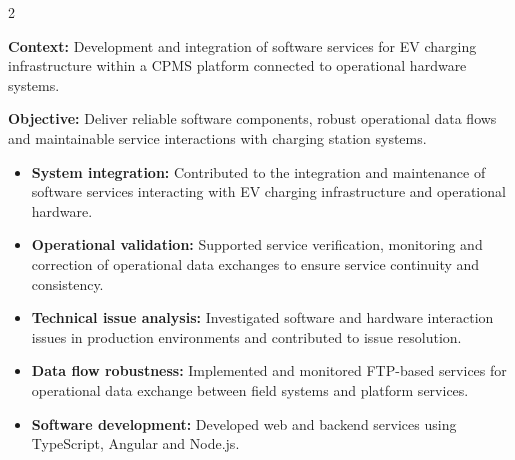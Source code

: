 \documentclass[8pt,a4paper,ragged2e,withhyper]{../_shared/altacv}
\begin{document}



\makecvheader

\vspace{-0.3cm}


\begin{paracol}{2}



\textbf{Context:} Development and integration of software services for EV charging infrastructure within a CPMS platform connected to operational hardware systems.

\textbf{Objective:} Deliver reliable software components, robust operational data flows and maintainable service interactions with charging station systems.

\begin{itemize}
\item \textbf{System integration:} Contributed to the integration and maintenance of software services interacting with EV charging infrastructure and operational hardware.
\item \textbf{Operational validation:} Supported service verification, monitoring and correction of operational data exchanges to ensure service continuity and consistency.
\item \textbf{Technical issue analysis:} Investigated software and hardware interaction issues in production environments and contributed to issue resolution.
\item \textbf{Data flow robustness:} Implemented and monitored FTP-based services for operational data exchange between field systems and platform services.
\item \textbf{Software development:} Developed web and backend services using TypeScript, Angular and Node.js.
\end{itemize}


\end{paracol}
\end{document}
